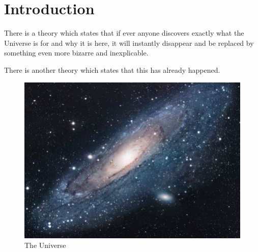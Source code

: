 \chapter*{Introduction}

There is a theory which states that if ever anyone discovers exactly what the Universe is for and why it is here, it will instantly disappear and be replaced by something even more bizarre and inexplicable.

There is another theory which states that this has already happened.

\begin{figure}[h!]
	\centering
	\includegraphics[scale=1.7]{images/universe.jpg}
	\caption{The Universe}
	\label{fig:universe}
\end{figure}